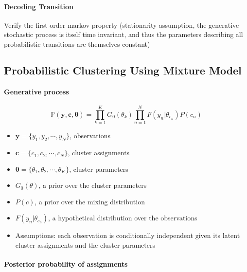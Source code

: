 \paragraph*{Decoding Transition}















Verify the first order markov property (stationarity assumption, the generative stochastic process is itself time invariant, and thus the parameters describing all probabilistic transitions are themselves constant)


\subsection{Probabilistic Clustering Using Mixture Model}

\paragraph{Generative process}

\begin{equation}
\mathbb{P} (\mathbf{y}, \mathbf{c}, \bm \theta) = \prod_{k=1}^K G_0 (\theta_k) \prod_{n=1}^N F(y_n | \theta_{c_n}) P(c_n)
\end{equation}

\begin{itemize}
\item $\mathbf{y} = \{y_1, y_2, \cdots, y_N \}$, observations
\item $\mathbf{c} = \{c_1, c_2, \cdots, c_N \}$, cluster assignments
\item $\bm \theta = \{\theta_1, \theta_2, \cdots, \theta_K \}$, cluster parameters
\item $G_0(\theta)$, a prior over the cluster parameters
\item $P(c)$, a prior over the mixing distribution
\item $F(y_n|\theta_{c_n})$, a hypothetical distribution over the observations
\item Assumptions: each observation is conditionally independent given its latent cluster assignments and the cluster parameters
\end{itemize}

\paragraph{Posterior probability of assignments}

